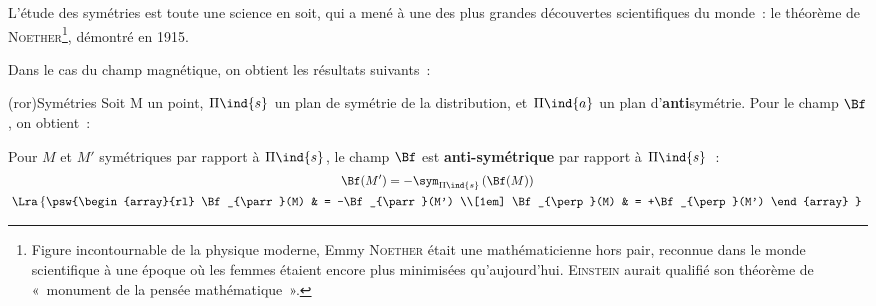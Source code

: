 \documentclass[../../main/main.tex]{subfiles}
\begin{document}
L'étude des symétries est toute une science en soit, qui a mené à une des plus
grandes découvertes scientifiques du monde~: le théorème de
\textsc{Noether}\footnote{Figure incontournable de la physique moderne, Emmy
	\textsc{Noether} était une mathématicienne hors pair, reconnue dans le monde
	scientifique à une époque où les femmes étaient encore plus minimisées
	qu'aujourd'hui. \textsc{Einstein} aurait qualifié son théorème de «~monument
	de la pensée mathématique~».}, démontré en 1915.

Dans le cas du champ magnétique, on obtient les résultats suivants~:

\begin{tcb*}(ror){Symétries}
	Soit M un point, $\Pi\ind{s}$ un plan de symétrie de la distribution, et
	$\Pi\ind{a}$ un plan d'\textbf{anti}symétrie. Pour le champ $\Bf$, on
	obtient~:
	\smallbreak
	\begin{isd}[sidebyside align=top]
		Pour $M$ et $M'$ symétriques par rapport à $\Pi\ind{s}$, le champ $\Bf$ est
		\textbf{anti-symétrique} par rapport à $\Pi\ind{s}$~:
		\begin{gather*}
			\Bf(M') = -\sym_{\Pi\ind{s}} \left(\Bf(M)\right)
			\\\Lra
			\left\{
			\psw{%
				\begin{array}{rl}
					\Bf_{\parr}(M) & = -\Bf_{\parr}(M')
					\\[1em]
					\Bf_{\perp}(M) & = +\Bf_{\perp}(M')
				\end{array}
			}%
			\right.
		\end{gather*}
		\begin{center}
\end{center}
\end{isd}
\end{tcb*}
\end{document}
